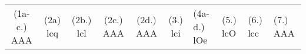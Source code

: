 \begin{eocexercises}{}
\begin{enumerate}[noitemsep, label=\textbf{\arabic*}. ]
\end{enumerate}


\par \practiceinfo\\

\begin{tabular}[h]{cccccc}
 (1a-c.) AAA & (2a) lcq  &  (2b.) lcl & (2c.) AAA & (2d.) AAA &  (3.) lci &  (4a-d.) lOe  &  (5.) lcO  &  (6.) lcc & (7.) AAA

\end{tabular}

\end{eocexercises}
